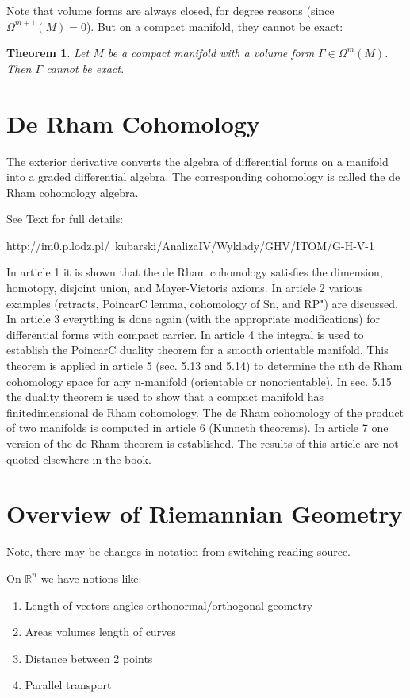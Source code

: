 \documentclass{article}
\newtheorem{theorem}{Theorem}[section]
\theoremstyle{definition}
\begin{document}
Note that volume forms are always closed, for degree reasons (since $\Omega^{m+1} (M) = 0$). But on a compact manifold, they cannot be exact:

\begin{theorem}

Let $M$ be a compact manifold with a volume form $\Gamma \in \Omega^m(M)$. Then $\Gamma$ cannot be exact.
\end{theorem}


\section{De Rham Cohomology}

The exterior derivative converts the algebra of differential forms on a manifold into a graded differential algebra. The corresponding cohomology is called the de Rham cohomology algebra. 

See Text for full details: \begin{url}
http://im0.p.lodz.pl/~kubarski/AnalizaIV/Wyklady/GHV/ITOM/G-H-V-1%
\end{url}

In article 1 it is shown that the de Rham cohomology satisfies the dimension, homotopy, disjoint union, and Mayer-Vietoris axioms. In article 2 various examples (retracts, PoincarC lemma, cohomology of Sn, and RP") are discussed. In article 3 everything is done again (with the appropriate modifications) for differential forms with compact carrier. In article 4 the integral is used to establish the PoincarC duality theorem for a smooth orientable manifold. This theorem is applied in article 5 (sec. 5.13 and 5.14) to determine the nth de Rham cohomology space for any n-manifold (orientable or nonorientable). In sec. 5.15 the duality theorem is used to show that a compact manifold has finitedimensional de Rham cohomology. The de Rham cohomology of the product of two manifolds is computed in article 6 (Kunneth theorems). In article 7 one version of the de Rham theorem is established. The results of this article are not quoted elsewhere in the book. 

\section{Overview of Riemannian Geometry}
Note, there may be changes in notation from switching reading source.

On $\mathbb R^n$ we have notions like:
\begin{enumerate}
    \item Length of vectors angles orthonormal/orthogonal geometry
    \item Areas volumes length of curves
    \item Distance between 2 points
    \item Parallel transport
\end{enumerate}
\end{document}
